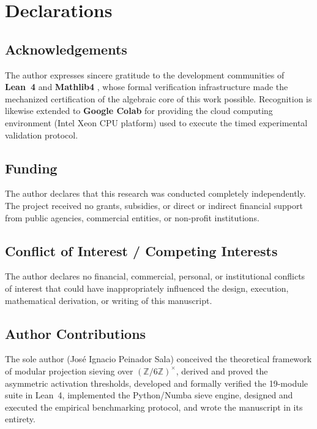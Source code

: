 \documentclass[11pt]{amsart}
\numberwithin{equation}{section}
\newcommand{\ZZ}{\mathbb{Z}}
\theoremstyle{plain}
\theoremstyle{definition}
\begin{document}
\section*{Declarations}

\subsection*{Acknowledgements}
The author expresses sincere gratitude to the development communities of 
\textbf{Lean~4} \cite{Lean4} and \textbf{Mathlib4} \cite{Mathlib2020}, whose 
formal verification infrastructure made the mechanized certification of the 
algebraic core of this work possible. Recognition is likewise extended to 
\textbf{Google Colab} for providing the cloud computing environment (Intel Xeon 
CPU platform) used to execute the timed experimental validation protocol.

\subsection*{Funding}
The author declares that this research was conducted completely independently. 
The project received no grants, subsidies, or direct or indirect financial 
support from public agencies, commercial entities, or non-profit institutions.

\subsection*{Conflict of Interest / Competing Interests}
The author declares no financial, commercial, personal, or institutional 
conflicts of interest that could have inappropriately influenced the design, 
execution, mathematical derivation, or writing of this manuscript.

\subsection*{Author Contributions}
The sole author (Jos\'e Ignacio Peinador Sala) conceived the theoretical 
framework of modular projection sieving over $(\ZZ/6\ZZ)^\times$, derived and 
proved the asymmetric activation thresholds, developed and formally verified 
the 19-module suite in Lean~4, implemented the Python/Numba sieve engine, 
designed and executed the empirical benchmarking protocol, and wrote the 
manuscript in its entirety.
\end{document}
